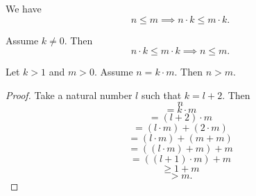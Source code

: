 \documentclass[../../natural-numbers.ftl.tex]{subfiles}
\begin{document}
\begin{forthel}
    \begin{corollary}[NN 02 03 419208]
      We have
      $$n \leq m \implies n \cdot k \leq m \cdot k.$$
    \end{corollary}

    \begin{corollary}[NN 02 03 582576]
      Assume $k \neq 0$.
      Then
      $$n \cdot k \leq m \cdot k \implies n \leq m.$$
    \end{corollary}

    \begin{proposition}[NN 02 03 252473]
      Let $k > 1$ and $m > 0$.
      Assume $n = k \cdot m$.
      Then $n > m$.
    \end{proposition}
    \begin{proof}
      Take a natural number $l$ such that $k = l + 2$.
      Then
      $$     n$$
      $$=    k \cdot m$$
      $$=    (l + 2) \cdot m$$
      $$=    (l \cdot m) + (2 \cdot m)$$
      $$=    (l \cdot m) + (m + m)$$
      $$=    ((l \cdot m) + m) + m$$
      $$=    ((l + 1) \cdot m) + m$$
      $$\geq 1 + m$$
      $$>    m.$$
    \end{proof}
  \end{forthel}
\end{document}
